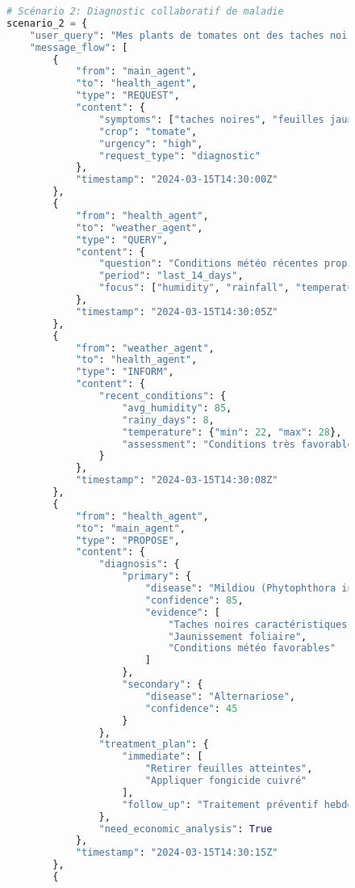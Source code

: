 \begin{figure}[h]
\begin{lstlisting}[language=Python, caption=Exemples de communications inter-agents en action]
# Scénario 2: Diagnostic collaboratif de maladie
scenario_2 = {
    "user_query": "Mes plants de tomates ont des taches noires et les feuilles jaunissent",
    "message_flow": [
        {
            "from": "main_agent",
            "to": "health_agent",
            "type": "REQUEST",
            "content": {
                "symptoms": ["taches noires", "feuilles jaunes"],
                "crop": "tomate",
                "urgency": "high",
                "request_type": "diagnostic"
            },
            "timestamp": "2024-03-15T14:30:00Z"
        },
        {
            "from": "health_agent",
            "to": "weather_agent",
            "type": "QUERY",
            "content": {
                "question": "Conditions météo récentes propices maladies fongiques?",
                "period": "last_14_days",
                "focus": ["humidity", "rainfall", "temperature"]
            },
            "timestamp": "2024-03-15T14:30:05Z"
        },
        {
            "from": "weather_agent",
            "to": "health_agent",
            "type": "INFORM",
            "content": {
                "recent_conditions": {
                    "avg_humidity": 85,
                    "rainy_days": 8,
                    "temperature": {"min": 22, "max": 28},
                    "assessment": "Conditions très favorables champignons"
                }
            },
            "timestamp": "2024-03-15T14:30:08Z"
        },
        {
            "from": "health_agent",
            "to": "main_agent",
            "type": "PROPOSE",
            "content": {
                "diagnosis": {
                    "primary": {
                        "disease": "Mildiou (Phytophthora infestans)",
                        "confidence": 85,
                        "evidence": [
                            "Taches noires caractéristiques",
                            "Jaunissement foliaire",
                            "Conditions météo favorables"
                        ]
                    },
                    "secondary": {
                        "disease": "Alternariose",
                        "confidence": 45
                    }
                },
                "treatment_plan": {
                    "immediate": [
                        "Retirer feuilles atteintes",
                        "Appliquer fongicide cuivré"
                    ],
                    "follow_up": "Traitement préventif hebdomadaire"
                },
                "need_economic_analysis": True
            },
            "timestamp": "2024-03-15T14:30:15Z"
        },
        {

\end{lstlisting}
\end{figure}

